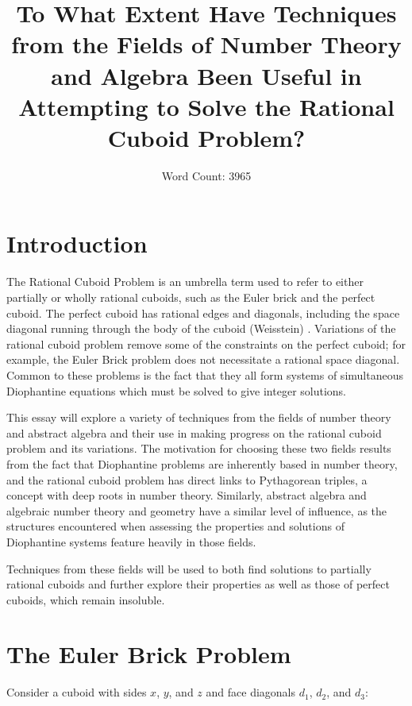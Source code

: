 \documentclass[11pt]{article}
\title{\textbf{To What Extent Have Techniques from the Fields of Number Theory and Algebra Been Useful in Attempting to Solve the Rational Cuboid Problem?}}
\author{Word Count: 3965}
\date{}
\begin{document}
\maketitle
\newpage
\tableofcontents
\newpage

\section{Introduction}
The Rational Cuboid Problem is an umbrella term used to refer to either partially or wholly rational cuboids, such as the Euler brick and the perfect cuboid. The perfect cuboid has rational edges and diagonals, including the space diagonal running through the body of the cuboid (Weisstein) \cite{perfectcuboid}. Variations of the rational cuboid problem remove some of the constraints on the perfect cuboid; for example, the Euler Brick problem does not necessitate a rational space diagonal. Common to these problems is the fact that they all form systems of simultaneous Diophantine equations which must be solved to give integer solutions.

This essay will explore a variety of techniques from the fields of number theory and abstract algebra and their use in making progress on the rational cuboid problem and its variations. The motivation for choosing these two fields results from the fact that Diophantine problems are inherently based in number theory, and the rational cuboid problem has direct links to Pythagorean triples, a concept with deep roots in number theory. Similarly, abstract algebra and algebraic number theory and geometry have a similar level of influence, as the structures encountered when assessing the properties and solutions of Diophantine systems feature heavily in those fields.

Techniques from these fields will be used to both find solutions to partially rational cuboids and further explore their properties as well as those of perfect cuboids, which remain insoluble.

\section{The Euler Brick Problem}
Consider a cuboid with sides $x$, $y$, and $z$ and face diagonals $d_1$, $d_2$, and $d_3$:
\end{document}
